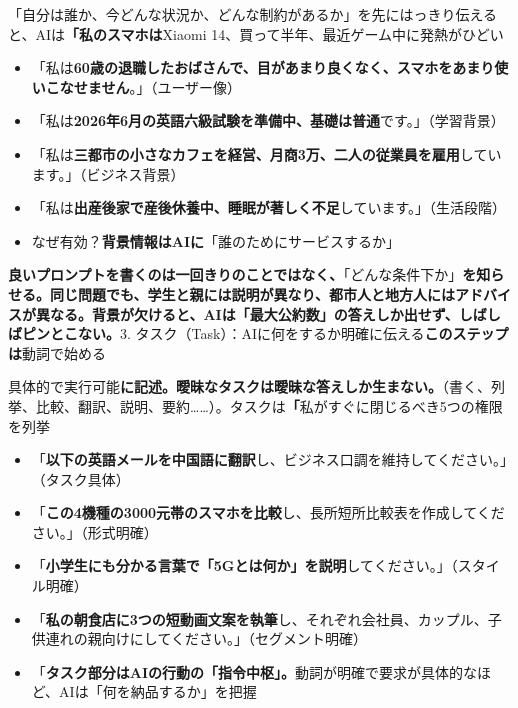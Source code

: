 
「自分は誰か、今どんな状況か、どんな制約があるか」を先にはっきり伝えると、AIは\textbf{「私のスマホは}Xiaomi 14、買って半年、最近ゲーム中に発熱がひどい


\begin{itemize}
  \item 「私は\textbf{60歳の退職したおばさんで、目があまり良くなく、スマホをあまり使いこなせません}。」（ユーザー像）
  \item 「私は\textbf{2026年6月の英語六級試験を準備中、基礎は普通}です。」（学習背景）
  \item 「私は\textbf{三都市の小さなカフェを経営、月商3万、二人の従業員を雇用}しています。」（ビジネス背景）
  \item 「私は\textbf{出産後家で産後休養中、睡眠が著しく不足}しています。」（生活段階）
  \item なぜ有効？\textbf{背景情報はAIに}「誰のためにサービスするか」
\end{itemize}

\textbf{良いプロンプトを書くのは一回きりのことではなく、}「どんな条件下か」\textbf{を知らせる。同じ問題でも、学生と親には説明が異なり、都市人と地方人にはアドバイスが異なる。背景が欠けると、AIは「最大公約数」の答えしか出せず、しばしばピンとこない。}3. タスク（Task）：AIに何をするか明確に伝える\textbf{このステップは}動詞で始める


具体的で実行可能\textbf{に記述。曖昧なタスクは曖昧な答えしか生まない。}（書く、列挙、比較、翻訳、説明、要約……）。タスクは\textbf{「}私がすぐに閉じるべき5つの権限を列挙


\begin{itemize}
  \item 「\textbf{以下の英語メールを中国語に翻訳}し、ビジネス口調を維持してください。」（タスク具体）
  \item 「\textbf{この4機種の3000元帯のスマホを比較}し、長所短所比較表を作成してください。」（形式明確）
  \item 「\textbf{小学生にも分かる言葉で「5Gとは何か」を説明}してください。」（スタイル明確）
  \item 「\textbf{私の朝食店に3つの短動画文案を執筆}し、それぞれ会社員、カップル、子供連れの親向けにしてください。」（セグメント明確）
  \item 「\textbf{タスク部分はAIの行動の「指令中枢」。}動詞が明確で要求が具体的なほど、AIは「何を納品するか」を把握
\end{itemize}

